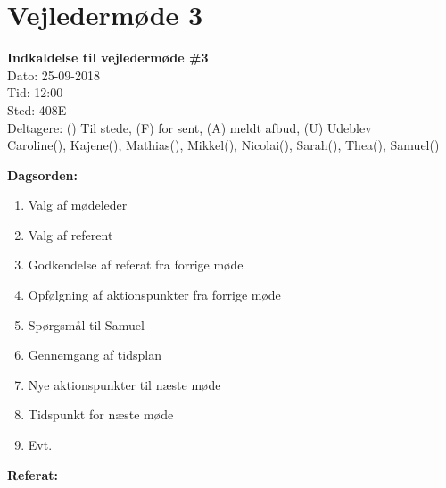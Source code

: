 \section{Vejledermøde 3}

\vspace{0.5 cm}
\textbf{Indkaldelse til vejledermøde \#3} \\

Dato: 25-09-2018 \\
Tid: 12:00 \\
Sted: 408E \\
Deltagere: () Til stede, (F) for sent, (A) meldt afbud, (U) Udeblev \\
Caroline(), Kajene(), Mathias(), Mikkel(), Nicolai(), Sarah(), Thea(), Samuel() 

\vspace{0.1 cm}
\textbf{Dagsorden:}

\begin{enumerate}
	\item Valg af mødeleder
	\item Valg af referent
	\item Godkendelse af referat fra forrige møde
	\item Opfølgning af aktionspunkter fra forrige møde
	\item Spørgsmål til Samuel
	\item Gennemgang af tidsplan
	\item Nye aktionspunkter til næste møde
	\item Tidspunkt for næste møde
	\item Evt.
\end{enumerate}

\textbf{Referat:}

